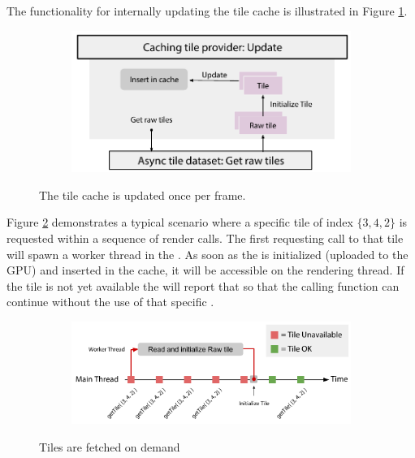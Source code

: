 The functionality for internally updating the tile cache is illustrated in Figure \ref{fig:cachingtileprovider_update}.

\begin{figure}[htbp]
    \centering
    \begin{subfigure}[bt]{0.6\textwidth}
        \includegraphics[width=\textwidth]{figures/implementation/tileprovider/cachingtileprovider_update.pdf}
    \end{subfigure}
    \caption{The tile cache is updated once per frame.}
    \label{fig:cachingtileprovider_update}
\end{figure}

Figure \ref{fig:cachingtileprovider_tilerequest} demonstrates a typical scenario where a specific tile of index $\{3, 4, 2\}$ is requested within a sequence of render calls. The first requesting call to that tile will spawn a worker thread in the . As soon as the  is initialized (uploaded to the GPU) and inserted in the cache, it will be accessible on the rendering thread. If the tile is not yet available the  will report that so that the calling function can continue without the use of that specific .

\begin{figure}[htbp]
    \centering
    \begin{subfigure}[bt]{0.8\textwidth}
        \includegraphics[width=\textwidth]{figures/implementation/tileprovider/cachingtileprovider_tilerequest.pdf}
    \end{subfigure}
    \caption{Tiles are fetched on demand}
    \label{fig:cachingtileprovider_tilerequest}
\end{figure}


